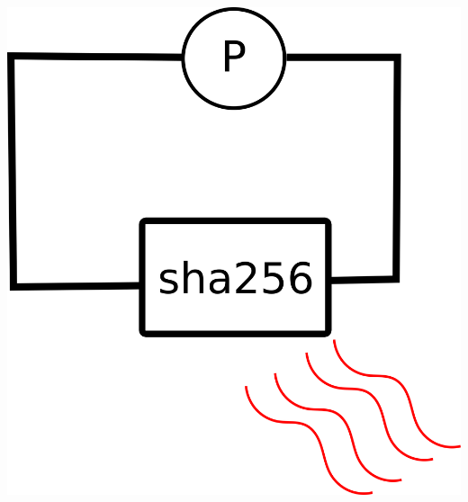 \documentclass{beamer}
\begin{document}
\begin{frame}{\insertsection}
%    
%    
%    
%    
%    
%    
%    
%    
%    
%    
\begin{columns}
    \begin{column}{.5\textwidth}
    \includegraphics[width=\textwidth]{images/sha256-heat.png}

\end{column}
\end{columns}
\end{frame}
\end{document}
